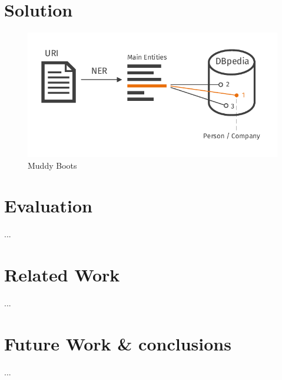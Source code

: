 \documentclass{llncs}
\begin{document}
\section{Solution}
%
\begin{figure}[!h]
  \includegraphics[width=\textwidth]{images/muddy_boots_dark}
  \caption{Muddy Boots}
  \label{fig:muddy}
\end{figure}
%
\section{Evaluation}
%
...
%
\section{Related Work}
%
...
%
\section{Future Work \& conclusions}
%
...

%
%
%
\end{document}
